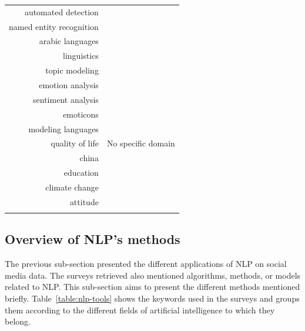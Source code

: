 \begin{center}
\begin{longtable}{rl}
        automated detection             &                              \\
        named entity recognition        &                              \\
        arabic languages                &                              \\
        linguistics                     &                              \\
        topic modeling                  &                              \\
        emotion analysis                &                              \\
        sentiment analysis              &                              \\
        emoticons                       &                              \\
        modeling languages              &                              \\
        quality of life                 & No specific domain           \\
        china                           &                              \\
        education                       &                              \\
        climate change                  &                              \\
        attitude                        &                              \\
        \bottomrule
        \label{table:application-domains}
    \end{longtable}
\end{center}

\subsection{Overview of NLP's methods}
The previous sub-section presented the different applications of NLP on social media data.
The surveys retrieved also mentioned algorithms, methods, or models related to NLP.
This sub-section aims to present the different methods mentioned briefly.
Table~\ref{table:nlp-tools} shows the keywords used in the surveys and groups them according to the different fields of artificial intelligence to which they belong.

